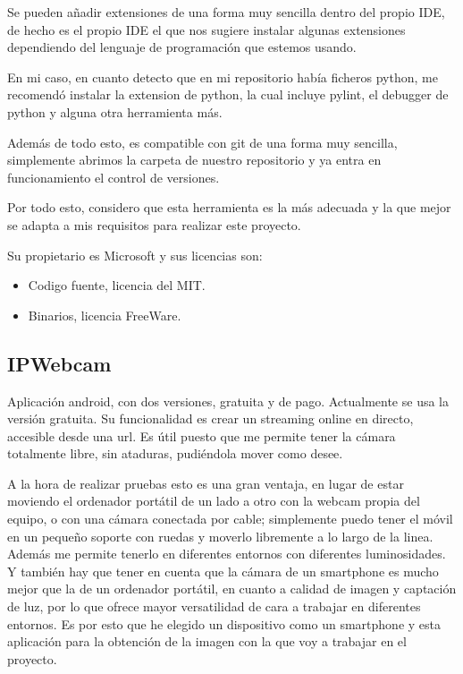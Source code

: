 Se pueden añadir extensiones de una forma muy sencilla dentro del propio IDE, de hecho es el propio IDE el que nos sugiere instalar algunas extensiones dependiendo del lenguaje de programación que estemos usando. 

En mi caso, en cuanto detecto que en mi repositorio había ficheros python, me recomendó instalar la extension de python, la cual incluye pylint, el debugger de python y alguna otra herramienta más.

Además de todo esto, es compatible con git de una forma muy sencilla, simplemente abrimos la carpeta de nuestro repositorio y ya entra en funcionamiento el control de versiones.

Por todo esto, considero que esta herramienta es la más adecuada y la que mejor se adapta a mis requisitos para realizar este proyecto.

Su propietario es Microsoft y sus licencias son:
\begin{itemize}
	\item Codigo fuente, licencia del MIT.
	\item Binarios, licencia FreeWare.
\end{itemize}

\subsection{IPWebcam}
Aplicación android, con dos versiones, gratuita y de pago. Actualmente se usa la versión gratuita.
Su funcionalidad es crear un streaming online en directo, accesible desde una url. Es útil puesto que me permite tener la cámara totalmente libre, sin ataduras, pudiéndola mover como desee.

A la hora de realizar pruebas esto es una gran ventaja, en lugar de estar moviendo el ordenador portátil de un lado a otro con la webcam propia del equipo, o con una cámara conectada por cable; simplemente puedo tener el móvil en un pequeño soporte con ruedas y moverlo libremente a lo largo de la linea. Además me permite tenerlo en diferentes entornos con diferentes luminosidades. Y también hay que tener en cuenta que la cámara de un smartphone es mucho mejor que la de un ordenador portátil, en cuanto a calidad de imagen y captación de luz, por lo que ofrece mayor versatilidad de cara a trabajar en diferentes entornos. Es por esto que he elegido un dispositivo como un smartphone y esta aplicación para la obtención de la imagen con la que voy a trabajar en el proyecto.





 
